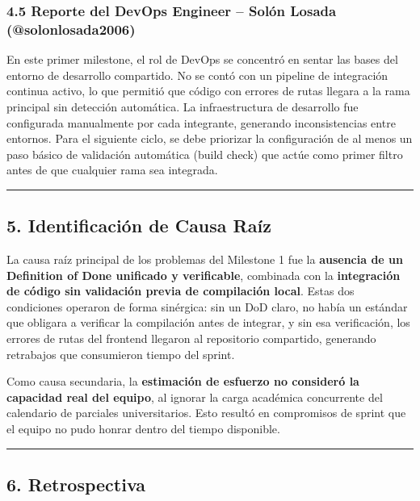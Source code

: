 \documentclass[11pt,a4paper]{article}
\begin{document}
\subsubsection{4.5 Reporte del DevOps Engineer -- Solón Losada (@solonlosada2006)}

En este primer milestone, el rol de DevOps se concentró en sentar las bases del entorno de desarrollo compartido. No se contó con un pipeline de integración continua activo, lo que permitió que código con errores de rutas llegara a la rama principal sin detección automática. La infraestructura de desarrollo fue configurada manualmente por cada integrante, generando inconsistencias entre entornos. Para el siguiente ciclo, se debe priorizar la configuración de al menos un paso básico de validación automática (build check) que actúe como primer filtro antes de que cualquier rama sea integrada.

\vspace{0.6em}\hrule\vspace{0.8em}

\subsection{5. Identificación de Causa Raíz}

La causa raíz principal de los problemas del Milestone 1 fue la \textbf{ausencia de un Definition of Done unificado y verificable}, combinada con la \textbf{integración de código sin validación previa de compilación local}. Estas dos condiciones operaron de forma sinérgica: sin un DoD claro, no había un estándar que obligara a verificar la compilación antes de integrar, y sin esa verificación, los errores de rutas del frontend llegaron al repositorio compartido, generando retrabajos que consumieron tiempo del sprint.

Como causa secundaria, la \textbf{estimación de esfuerzo no consideró la capacidad real del equipo}, al ignorar la carga académica concurrente del calendario de parciales universitarios. Esto resultó en compromisos de sprint que el equipo no pudo honrar dentro del tiempo disponible.

\vspace{0.6em}\hrule\vspace{0.8em}

\subsection{6. Retrospectiva}
\end{document}
